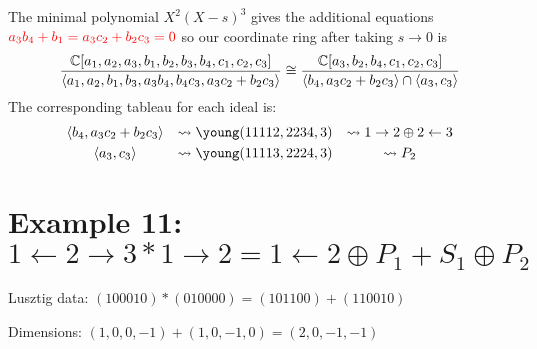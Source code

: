 \documentclass{article}
\begin{document}
The minimal polynomial $X^2(X-s)^3$ gives the additional equations ${\color{red} a_3b_4 + b_1 = a_3c_2 + b_2c_3 = 0}$ so our coordinate ring after taking $s \rightarrow 0$ is
$$\frac{\mathbb C[a_1,a_2,a_3,b_1,b_2,b_3,b_4,c_1,c_2,c_3]}{\langle a_1,a_2,b_1,b_3,a_3b_4,b_4c_3,a_3c_2+b_2c_3 \rangle} \cong \frac{\mathbb C[a_3,b_2,b_4,c_1,c_2,c_3]}{\langle b_4,a_3c_2+b_2c_3 \rangle \cap \langle a_3,c_3 \rangle}$$
The corresponding tableau for each ideal is:
\[\begin{array}{ccc}\vspace{1mm}
    \langle b_4,a_3c_2+b_2c_3 \rangle &\leadsto \young(11112,2234,3) &\leadsto 1 \rightarrow 2 \oplus 2 \leftarrow 3 \\ 
    \langle a_3,c_3 \rangle &\leadsto \young(11113,2224,3) &\leadsto P_2
\end{array}
\]

\section{Example 11: $1 \leftarrow 2 \rightarrow 3 * 1 \rightarrow 2 = 1 \leftarrow 2 \oplus P_1  + S_1 \oplus P_2$}
Lusztig data: $(100010) * (010000) = (101100) + (110010)$

Dimensions: $(1,0,0,-1) + (1,0,-1,0) = (2,0,-1,-1)$
\end{document}
